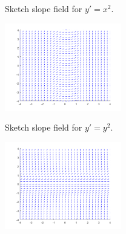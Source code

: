 \begin{exercise}
Sketch slope field for $y'=x^2$.
\end{exercise}
\comboSol{%
}
{%
\includegraphics[width=2in]{Images/slopefieldx2.png}
}

\begin{exercise}
Sketch slope field for $y'=y^2$.
\end{exercise}
\comboSol{%
}
{%
\includegraphics[width=2in]{Images/slopefieldy2.png}
}


